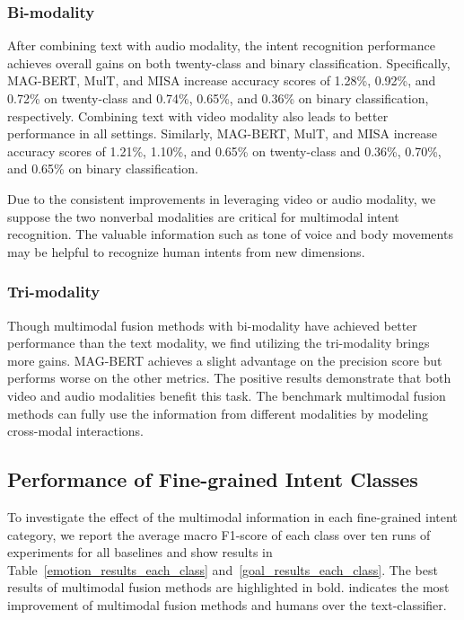 \documentclass[sigconf,camera-ready]{acmart}
\begin{document}
\subsubsection{Bi-modality} 
After combining text with audio modality, the intent recognition performance achieves overall gains on both twenty-class and binary classification. Specifically, MAG-BERT, MulT, and MISA  increase accuracy scores of 1.28\%, 0.92\%, and 0.72\% on twenty-class and 0.74\%, 0.65\%, and 0.36\% on binary classification, respectively. Combining text with video modality also leads to better performance in all settings. Similarly, MAG-BERT, MulT, and MISA increase accuracy scores of 1.21\%, 1.10\%, and 0.65\% on twenty-class and 0.36\%, 0.70\%, and 0.65\% on binary classification. 

Due to the consistent improvements in leveraging video or audio modality, we suppose the two nonverbal modalities are critical for multimodal intent recognition. The valuable information such as tone of voice and body movements may be helpful to recognize human intents from new dimensions. 

\subsubsection{Tri-modality}
Though multimodal fusion methods with bi-modality have achieved better performance than the text modality, we find utilizing the tri-modality brings more gains. MAG-BERT achieves a slight advantage on the precision score but performs worse on the other metrics. The positive results demonstrate that both video and audio modalities benefit this task. The benchmark multimodal fusion methods can fully use the information from different modalities by modeling cross-modal interactions.

\subsection{Performance of Fine-grained Intent Classes}
To investigate the effect of the multimodal information in each fine-grained intent category, we report the average macro F1-score of each class over ten runs of experiments for all baselines and show results in Table~\ref{emotion_results_each_class} and~\ref{goal_results_each_class}. The best results of multimodal fusion methods are highlighted in bold.  indicates the most improvement of multimodal fusion methods and humans over the text-classifier. 
\end{document}
